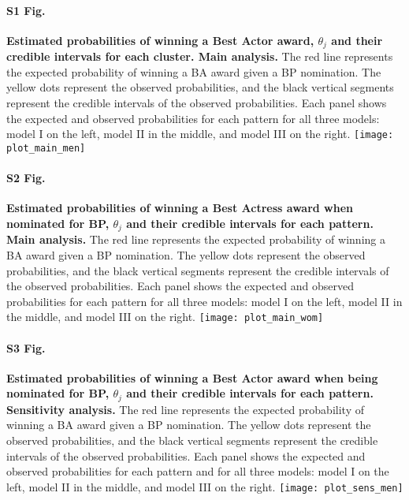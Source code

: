 \documentclass[10pt,letterpaper]{article}
\begin{document}
\paragraph{S1 Fig.}
{\label{S1_Fig}
{\bf Estimated probabilities of winning a Best Actor award, $\theta_j$ and their credible intervals for each cluster. Main analysis.} The red line represents the expected probability of winning a BA award given a BP nomination. The yellow dots represent the observed probabilities, and the black vertical segments represent the credible intervals of the observed probabilities. Each panel shows the expected and observed probabilities for each pattern for all three models: model I on the left, model II in the middle, and model III on the right.
\texttt{[image: plot\_main\_men]}
}

{\paragraph{S2 Fig.}
\label{S2_Fig}
{\bf Estimated probabilities of winning a Best Actress award when nominated for BP, $\theta_j$ and their credible intervals for each pattern. Main analysis.} The red line represents the expected probability of winning a BA award given a BP nomination. The yellow dots represent the observed probabilities, and the black vertical segments represent the credible intervals of the observed probabilities. Each panel shows the expected and observed probabilities for each pattern for all three models: model I on the left, model II in the middle, and model III on the right.
\texttt{[image: plot\_main\_wom]}
}

{\paragraph*{S3 Fig.}
\label{S3_Fig}
{\bf Estimated probabilities of winning a Best Actor award when being nominated for BP, $\theta_j$ and their credible intervals for each pattern. Sensitivity analysis.} The red line represents the expected probability of winning a BA award given a BP nomination. The yellow dots represent the observed probabilities, and the black vertical segments represent the credible intervals of the observed probabilities. Each panel shows the expected and observed probabilities for each pattern and for all three models: model I on the left, model II in the middle, and model III on the right.
\texttt{[image: plot\_sens\_men]}
}
\end{document}
